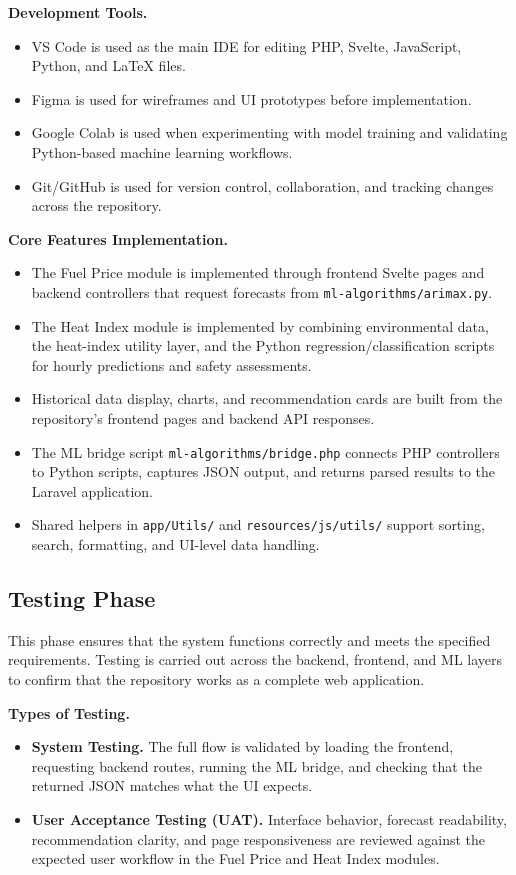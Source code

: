 \documentclass[12pt]{article}
\begin{document}
\medskip
\noindent\textbf{Development Tools.}
\begin{itemize}
    \item VS Code is used as the main IDE for editing PHP, Svelte, JavaScript, Python, and LaTeX files.
    \item Figma is used for wireframes and UI prototypes before implementation.
    \item Google Colab is used when experimenting with model training and validating Python-based machine learning workflows.
    \item Git/GitHub is used for version control, collaboration, and tracking changes across the repository.
\end{itemize}

\medskip
\noindent\textbf{Core Features Implementation.}
\begin{itemize}
    \item The Fuel Price module is implemented through frontend Svelte pages and backend controllers that request forecasts from \texttt{ml-algorithms/arimax.py}.
    \item The Heat Index module is implemented by combining environmental data, the heat-index utility layer, and the Python regression/classification scripts for hourly predictions and safety assessments.
    \item Historical data display, charts, and recommendation cards are built from the repository's frontend pages and backend API responses.
    \item The ML bridge script \texttt{ml-algorithms/bridge.php} connects PHP controllers to Python scripts, captures JSON output, and returns parsed results to the Laravel application.
    \item Shared helpers in \texttt{app/Utils/} and \texttt{resources/js/utils/} support sorting, search, formatting, and UI-level data handling.
\end{itemize}

\subsection{Testing Phase}

This phase ensures that the system functions correctly and meets the specified requirements. Testing is carried out across the backend, frontend, and ML layers to confirm that the repository works as a complete web application.

\newpage
\medskip
\noindent\textbf{Types of Testing.}
\begin{itemize}
    \item \textbf{System Testing.} The full flow is validated by loading the frontend, requesting backend routes, running the ML bridge, and checking that the returned JSON matches what the UI expects.
    \item \textbf{User Acceptance Testing (UAT).} Interface behavior, forecast readability, recommendation clarity, and page responsiveness are reviewed against the expected user workflow in the Fuel Price and Heat Index modules.
\end{itemize}
\end{document}

